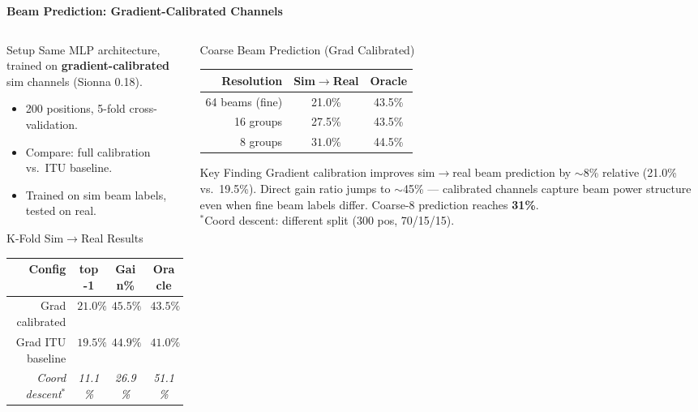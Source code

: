 \documentclass[
    aspectratio=169
]{beamer}
\begin{document}
\begin{frame}{\textbf{Beam Prediction: Gradient-Calibrated Channels}}
\vspace{-0.2cm}
\begin{columns}[T]
\begin{column}{0.48\textwidth}
\begin{block}{\footnotesize Setup}
\footnotesize
Same MLP architecture, trained on \textbf{gradient-calibrated} sim channels (Sionna 0.18).
\begin{itemize}
    \item 200 positions, 5-fold cross-validation.
    \item Compare: full calibration vs.\ ITU baseline.
    \item Trained on sim beam labels, tested on real.
\end{itemize}
\end{block}
\vspace{0.1cm}
\begin{block}{\footnotesize K-Fold Sim$\to$Real Results}
\scriptsize
\begin{tabular}{rccc}
\toprule
\textbf{Config} & \textbf{top-1} & \textbf{Gain\%} & \textbf{Oracle} \\
\midrule
\rowcolor{green!15} Grad calibrated & $\mathbf{21.0\%}$ & $\mathbf{45.5\%}$ & $43.5\%$ \\
Grad ITU baseline & $19.5\%$ & $44.9\%$ & $41.0\%$ \\
\midrule
\textit{Coord descent}$^*$ & \textit{11.1\%} & \textit{26.9\%} & \textit{51.1\%} \\
\bottomrule
\end{tabular}
\end{block}
\end{column}
\begin{column}{0.48\textwidth}
\begin{block}{\footnotesize Coarse Beam Prediction (Grad Calibrated)}
\scriptsize
\begin{tabular}{rcc}
\toprule
\textbf{Resolution} & \textbf{Sim$\to$Real} & \textbf{Oracle} \\
\midrule
64 beams (fine) & 21.0\% & 43.5\% \\
16 groups & 27.5\% & 43.5\% \\
\rowcolor{green!15} 8 groups & $\mathbf{31.0\%}$ & 44.5\% \\
\bottomrule
\end{tabular}
\end{block}
\vspace{0.1cm}
\begin{block}{\footnotesize Key Finding}
\footnotesize
Gradient calibration improves sim$\to$real beam prediction by $\sim$8\% relative (21.0\% vs.\ 19.5\%). Direct gain ratio jumps to $\sim$45\% --- calibrated channels capture beam power structure even when fine beam labels differ. Coarse-8 prediction reaches \textbf{31\%}. \\[3pt]
\scriptsize $^*$Coord descent: different split (300 pos, 70/15/15).
\end{block}
\end{column}
\end{columns}
\end{frame}
\end{document}
